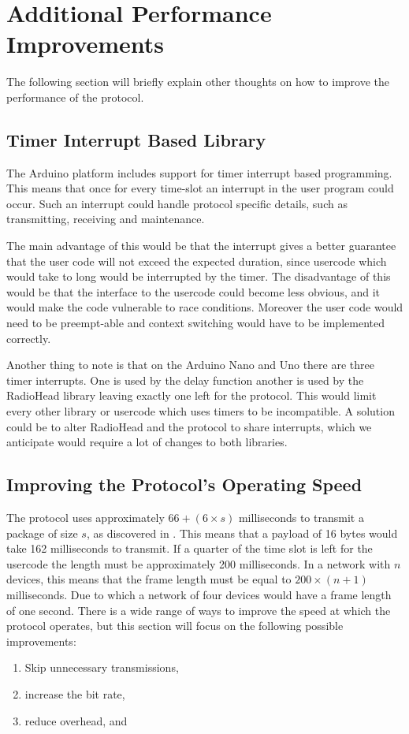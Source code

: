 \section{Additional Performance Improvements}
The following section will briefly explain other thoughts on how to improve the performance of the protocol.
\subsection{Timer Interrupt Based Library}
The Arduino platform includes support for timer interrupt based programming.
This means that once for every time-slot an interrupt in the user program could occur.
Such an interrupt could handle protocol specific details, such as transmitting, receiving and maintenance.

The main advantage of this would be that the interrupt gives a better guarantee that the user code will not exceed the expected duration, since usercode which would take to long would be interrupted by the timer.
The disadvantage of this would be that the interface to the usercode could become less obvious, and it would make the code vulnerable to race conditions.
Moreover the user code would need to be preempt-able and context switching would have to be implemented correctly.

Another thing to note is that on the Arduino Nano and Uno there are three timer interrupts.
One is used by the delay function another is used by the RadioHead library leaving exactly one left for the protocol.
This would limit every other library or usercode which uses timers to be incompatible.
A solution could be to alter RadioHead and the protocol to share interrupts, which we anticipate would require a lot of changes to both libraries.

\subsection{Improving the Protocol's Operating Speed}
The protocol uses approximately $66 + (6 \times s)$ milliseconds to transmit a package of size $s$, as discovered in  . 
This means that a payload of 16 bytes would take 162 milliseconds to transmit.
If a quarter of the time slot is left for the usercode the length must be approximately 200 milliseconds.
In a network with $n$ devices, this means that the frame length must be equal to $200 \times (n + 1)$ milliseconds.
Due to which a network of four devices would have a frame length of one second.
There is a wide range of ways to improve the speed at which the protocol operates, but this section will focus on the following possible improvements:
\begin{enumerate}[label=\itshape \alph*\upshape)]
    \item Skip unnecessary transmissions,
    \item increase the bit rate, 
    \item reduce overhead, and
\end{enumerate} 

